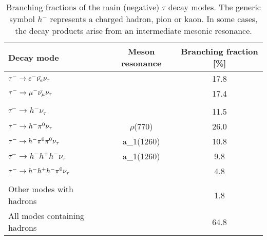 \begin{table}[]
    \centering
    \begin{tabular}{l c c}
        \hline
         Decay mode & Meson resonance & Branching fraction [\%] \\
         \hline
         $\tau^- \rightarrow e^- \Bar{\nu_e} \nu_\tau$ & & 17.8 \\
         $\tau^- \rightarrow \mu^- \Bar{\nu_\mu} \nu_\tau$ & & 17.4 \\
         & &  \\
         $\tau^- \rightarrow h^- \nu_\tau$ & & 11.5 \\
         $\tau^- \rightarrow h^- \pi^{0} \nu_\tau$ & $\rho$(770) & 26.0 \\
         $\tau^- \rightarrow h^- \pi^{0} \pi^{0} \nu_\tau$ & a_1(1260) & 10.8 \\
         $\tau^- \rightarrow h^- h^+ h^- \nu_\tau$ & a_1(1260) & 9.8 \\
         $\tau^- \rightarrow h^- h^+ h^- \pi^{0} \nu_\tau$ & & 4.8 \\
         & &  \\
         Other modes with hadrons & & 1.8 \\
         All modes containing hadrons & & 64.8 \\
         \hline
    \end{tabular}
    \caption{Branching fractions of the main (negative) $\tau$ decay modes. The generic symbol $h^-$ represents a charged hadron, pion or kaon. In some cases, the decay products arise from an intermediate mesonic resonance.}
    \label{tab:tau_decay_products}
\end{table}
